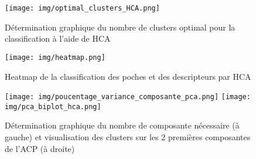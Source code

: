 \begin{minipage}{0.45\textwidth}
	\begin{figure}[H]
		\centering
		\texttt{[image: img/optimal\_clusters\_HCA.png]}
		\caption{Détermination graphique du nombre de clusters optimal pour la classification à l'aide de HCA}
		\label{fig3}
	\end{figure}
\end{minipage} 
\hfill
\begin{minipage}{0.5\textwidth}
	\begin{figure}[H]
        \centering
        \texttt{[image: img/heatmap.png]}
        \caption{Heatmap de la classification des poches et des descripteurs par HCA}
        \label{fig4}
    \end{figure}
\end{minipage}

\begin{figure}[H]
    \centering
    \texttt{[image: img/poucentage\_variance\_composante\_pca.png]}
    \texttt{[image: img/pca\_biplot\_hca.png]}
    \caption{Détermination graphique du nombre de composante nécessaire (à gauche) et visualisation des clusters sur les 2 premières composantes de l'ACP (à droite)}
    \label{fig5}
\end{figure}